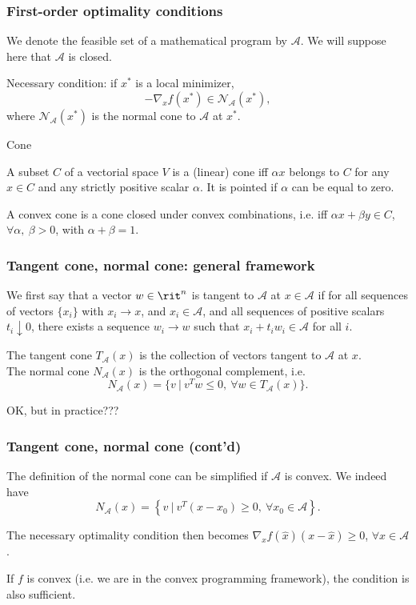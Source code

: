 \begin{frame}
\frametitle{First-order optimality conditions}

We denote the feasible set of a mathematical program by $\mathcal{A}$.
We will suppose here that $\mathcal{A}$ is closed.

\mbox{}

{\red Necessary condition}: if $x^*$ is a local minimizer,
\[
-\nabla_x f(x^*) \in \mathcal{N}_{\mathcal{A}}(x^*),
\]
where $\mathcal{N}_{\mathcal{A}}(x^*)$ is the normal cone to $\mathcal{A}$ at $x^*$.

\mbox{}

{\blue Cone}

\mbox
 
A subset $C$ of a vectorial space $V$ is a (linear) {\red cone}
iff $\alpha x$ belongs to $C$ for any $x \in C$ and any strictly positive scalar $\alpha$.
It is pointed if $\alpha$ can be equal to zero.

\mbox{}

A {\red convex cone} is a cone closed under convex combinations, i.e. iff $\alpha x + \beta y \in C$, $\forall \alpha,\ \beta > 0$, with $\alpha + \beta = 1$.

\end{frame}


\begin{frame}
\frametitle{Tangent cone, normal cone: general framework}

We first say that a vector $w \in \rit^n$ is tangent to $\mathcal{A}$ at $x \in \mathcal{A}$ if for all sequences of vectors $\lbrace x_i \rbrace$ with $x_i \rightarrow x$, and $x_i \in \mathcal{A}$, and all sequences of positive scalars $t_i \downarrow 0$, there exists a sequence $w_i \rightarrow w$ such that $x_i + t_iw_i \in \mathcal{A}$ for all $i$.

\mbox{}

The {\red tangent cone $T_{\mathcal{A}}(x)$} is the collection of vectors tangent to ${\mathcal{A}}$ at $x$. \\
The {\red normal cone $N_{\mathcal{A}}(x)$} is the orthogonal complement, i.e.
\[
N_{\mathcal{A}}(x) = \lbrace v\ |\ v^Tw \leq 0,\ \forall w \in T_{\mathcal{A}}(x) \rbrace.
\]

\mbox{}

OK, but in practice???

\end{frame}

\begin{frame}
\frametitle{Tangent cone, normal cone (cont'd)}

The definition of the normal cone can be simplified if ${\mathcal{A}}$ is convex.
We indeed have
\[
N_{\mathcal{A}}(x) = \left\lbrace v\ |\ v^T(x-x_0) \geq 0,\ \forall x_0 \in
{\mathcal{A}} \right\rbrace.
\]

\mbox{}

The necessary optimality condition then becomes
$\nabla_x f(\hat{x}) (x-\hat{x}) \geq 0$, $\forall x \in {\mathcal{A}}$.

\mbox{}

If $f$ is convex (i.e. we are in the convex programming framework), the condition is also sufficient.

\end{frame}

